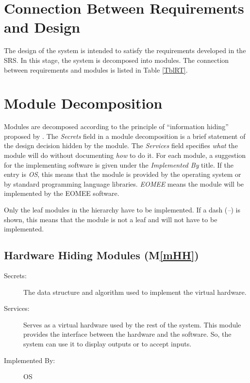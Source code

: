 \documentclass[12pt, titlepage]{article}
\newcommand{\mref}[1]{M\ref{#1}}
\begin{document}
\section{Connection Between Requirements and Design} \label{SecConnection}

The design of the system is intended to satisfy the requirements developed in
the SRS. In this stage, the system is decomposed into modules. The connection
between requirements and modules is listed in Table \ref{TblRT}.


\section{Module Decomposition} \label{SecMD}

Modules are decomposed according to the principle of ``information hiding''
proposed by \citet{ParnasEtAl1984}. The \emph{Secrets} field in a module
decomposition is a brief statement of the design decision hidden by the
module. The \emph{Services} field specifies \emph{what} the module will do
without documenting \emph{how} to do it. For each module, a suggestion for the
implementing software is given under the \emph{Implemented By} title. If the
entry is \emph{OS}, this means that the module is provided by the operating
system or by standard programming language libraries.  \emph{EOMEE} means the
module will be implemented by the EOMEE software.

Only the leaf modules in the hierarchy have to be implemented. If a dash
(\emph{--}) is shown, this means that the module is not a leaf and will not have
to be implemented.

\subsection{Hardware Hiding Modules (\mref{mHH})}

\begin{description}
\item[Secrets:]The data structure and algorithm used to implement the virtual
  hardware.
\item[Services:]Serves as a virtual hardware used by the rest of the
  system. This module provides the interface between the hardware and the
  software. So, the system can use it to display outputs or to accept inputs.
\item[Implemented By:] OS
\end{description}
\end{document}

